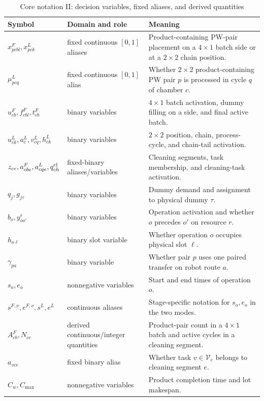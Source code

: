 \documentclass[final,5p,times,twocolumn]{elsarticle}
\begin{document}
\begin{table}[t]
\centering
\scriptsize
\setlength{\tabcolsep}{2.5pt}
\caption{Core notation II: decision variables, fixed aliases, and derived quantities}
\label{tab:symbol-en-b}
\begin{tabular}{p{}p{}p{}}
\toprule
Symbol & Domain and role & Meaning \\
\midrule
$x^F_{pcbl},x^L_{pck}$ & fixed continuous $[0,1]$ aliases & Product-containing PW-pair placement on a $4\times1$ batch side or at a $2\times2$ chain position.\\
$\mu^L_{pcq}$ & fixed continuous $[0,1]$ alias & Whether $2\times2$ product-containing PW pair $p$ is processed in cycle $q$ of chamber $c$.\\
$u^F_{cb},f^F_{cbl},t^F_{cb}$ & binary variables & $4\times1$ batch activation, dummy filling on a side, and final active batch.\\
$u^L_{ck},a^L_c,v^L_{cq},h^L_{ck}$ & binary variables & $2\times2$ position, chain, process-cycle, and chain-tail activation.\\
$z_{ce},a^F_{cbe},a^L_{cqe},q^{\rm cl}_{ch}$ & fixed-binary aliases/variables & Cleaning segments, task membership, and cleaning-task activation.\\
$q_j,g_{j\tau}$ & binary variables & Dummy demand and assignment to physical dummy $\tau$.\\
$b_o,y^r_{oo'}$ & binary variables & Operation activation and whether $o$ precedes $o'$ on resource $r$.\\
$h_{o\ell}$ & binary slot variable & Whether operation $o$ occupies physical slot $\ell$.\\
$\gamma_{pa}$ & binary variable & Whether pair $p$ uses one paired transfer on robot route $a$.\\
$s_o,e_o$ & nonnegative variables & Start and end times of operation $o$.\\
$s^{F,\nu},e^{F,\nu},s^L,e^L$ & continuous aliases & Stage-specific notation for $s_o,e_o$ in the two modes.\\
$A^F_{cb},N_{ce}$ & derived continuous/integer quantities & Product-pair count in a $4\times1$ batch and active cycles in a cleaning segment.\\
$a_{vce}$ & fixed binary alias & Whether task $v\in\mathcal V_c$ belongs to cleaning segment $e$.\\
$C_w,C_{\max}$ & nonnegative variables & Product completion time and lot makespan.\\

\end{tabular}
\end{table}
\end{document}
